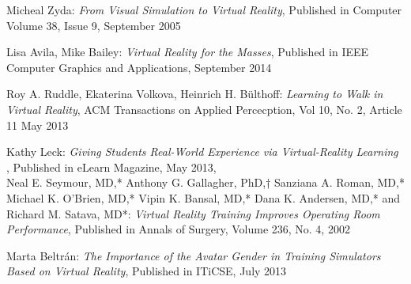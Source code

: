 \begin{bibliography}{9}

  	Micheal Zyda:
  	\emph{From Visual Simulation to Virtual Reality},
  	Published in Computer Volume 38, Issue 9,
  	September 2005
  	
  	Lisa Avila, Mike Bailey:
  	\emph{Virtual Reality for the Masses},
  	Published in IEEE Computer Graphics and Applications,
  	September 2014
  	
  	Roy A. Ruddle, Ekaterina Volkova, Heinrich H. Bülthoff:
  	\emph{Learning to Walk in Virtual Reality},
  	ACM Transactions on Applied Percecption, Vol 10, No. 2, Article 11
  	May 2013
  	
  	Kathy Leck:
  	\emph{Giving Students Real-World Experience via Virtual-Reality Learning },
  	Published in eLearn Magazine,
  	May 2013, \\
  	\hyperlink{http://elearnmag.acm.org/archive.cfm?aid=2484903}
  	
  	Neal E. Seymour, MD,* Anthony G. Gallagher, PhD,† Sanziana A. Roman, MD,* Michael K. O’Brien, MD,* Vipin K. Bansal, MD,*
Dana K. Andersen, MD,* and Richard M. Satava, MD*:
  	\emph{Virtual Reality Training Improves Operating Room Performance},
  	Published in Annals of Surgery,
  	Volume 236, No. 4,
  	2002

  	Marta Beltrán:
  	\emph{The Importance of the Avatar Gender in Training Simulators Based on Virtual Reality},
  	Published in ITiCSE,
  	July 2013
  	

\end{bibliography}	
